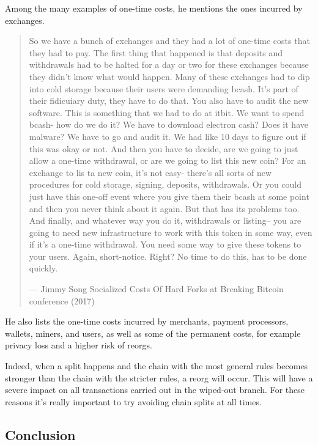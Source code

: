 Among the many examples of one-time costs, he mentions the ones incurred
by exchanges.

\begin{quote}
So we have a bunch of exchanges and they had a lot of one-time costs
that they had to pay. The first thing that happened is that deposits and
withdrawals had to be halted for a day or two for these exchanges
because they didn't know what would happen. Many of these exchanges had
to dip into cold storage because their users were demanding bcash. It's
part of their fidicuiary duty, they have to do that. You also have to
audit the new software. This is something that we had to do at itbit. We
want to spend bcash- how do we do it? We have to download electron cash?
Does it have malware? We have to go and audit it. We had like 10 days to
figure out if this was okay or not. And then you have to decide, are we
going to just allow a one-time withdrawal, or are we going to list this
new coin? For an exchange to lis ta new coin, it's not easy- there's all
sorts of new procedures for cold storage, signing, deposits,
withdrawals. Or you could just have this one-off event where you give
them their bcash at some point and then you never think about it again.
But that has its problems too. And finally, and whatever way you do it,
withdrawals or listing-- you are going to need new infrastructure to
work with this token in some way, even if it's a one-time withdrawal.
You need some way to give these tokens to your users. Again,
short-notice. Right? No time to do this, has to be done quickly.

---  Jimmy Song Socialized Costs Of Hard Forks at Breaking Bitcoin
conference (2017)
\end{quote}

He also lists the one-time costs incurred by merchants, payment
processors, wallets, miners, and users, as well as some of the permanent
costs, for example privacy loss and a higher risk of reorgs.

Indeed, when a split happens and the chain with the most general rules
becomes stronger than the chain with the stricter rules, a reorg will
occur. This will have a severe impact on all transactions carried out in
the wiped-out branch. For these reasons it's really important to try
avoiding chain splits at all times.

\hypertarget{_conclusion_3}{%
\subsection{Conclusion}\label{_conclusion_3}}

